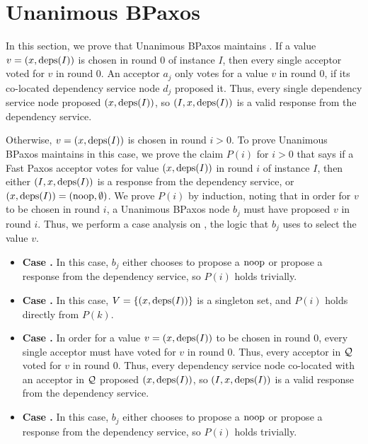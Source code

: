 \section{Unanimous BPaxos}
In this section, we prove that Unanimous BPaxos maintains
.
%
If a value $v = (x, \text{deps}(I))$ is chosen in round $0$ of instance $I$, then
every single acceptor voted for $v$ in round $0$. An acceptor $a_j$ only votes
for a value $v$ in round $0$, if its co-located dependency service node $d_j$
proposed it. Thus, every single dependency service node proposed $(x,
\text{deps}(I))$, so $(I, x, \text{deps}(I))$ is a valid response from the dependency
service.

Otherwise, $v = (x, \text{deps}(I))$ is chosen in round $i > 0$. To prove Unanimous
BPaxos maintains  in this case, we prove the
claim $P(i)$ for $i > 0$ that says if a Fast Paxos acceptor votes for value
$(x, \text{deps}(I))$ in round $i$ of instance $I$, then either
  $(I, x, \text{deps}(I))$ is a response from the dependency service, or
  $(x, \text{deps}(I)) = (\text{noop}, \emptyset)$.
We prove $P(i)$ by induction, noting that in order for $v$ to be chosen in
round $i$, a Unanimous BPaxos node $b_j$ must have proposed $v$ in round $i$.
Thus, we perform a case analysis on , the logic that
$b_j$ uses to select the value $v$.
\begin{itemize}
  \item \textbf{Case .}
    In this case, $b_j$ either chooses to propose a $\text{noop}$ or propose a
    response from the dependency service, so $P(i)$ holds trivially.

  \item \textbf{Case .}
    In this case, $V = \{(x, \text{deps}(I))\}$ is a singleton set, and $P(i)$
    holds directly from $P(k)$.

  \item \textbf{Case .}
    In order for a value $v = (x, \text{deps}(I))$ to be chosen in round $0$, every
    single acceptor must have voted for $v$ in round $0$. Thus, every acceptor
    in $\mathcal{Q}$ voted for $v$ in round $0$. Thus, every dependency service
    node co-located with an acceptor in $\mathcal{Q}$ proposed $(x, \text{deps}(I))$, so
    $(I, x, \text{deps}(I))$ is a valid response from the dependency service.

  \item \textbf{Case .}
    In this case, $b_j$ either chooses to propose a $\text{noop}$ or propose a
    response from the dependency service, so $P(i)$ holds trivially.
\end{itemize}
